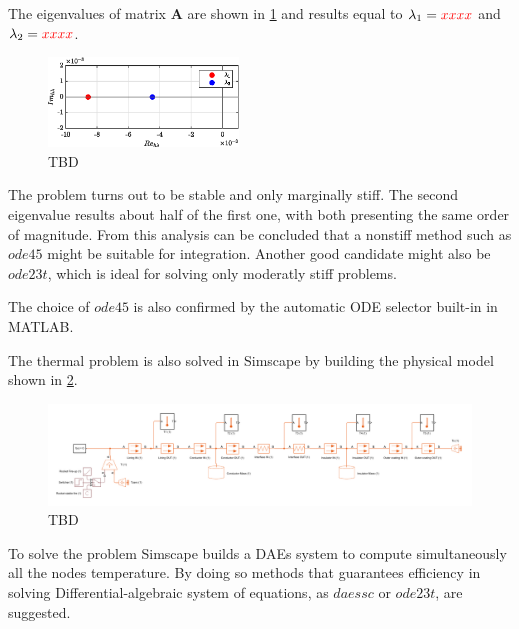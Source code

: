 \documentclass[11pt,a4paper,oneside]{article}
\renewcommand{\vec}[1]{\mathbf{#1}}
\newcommand{\tr}{\textcolor{red}}
\begin{document}
The eigenvalues of matrix $\vec{A}$ are shown in \cref{fig:ex1_eigenvalues} and results equal to $\lambda_1=\tr{xxxx}$ and $\lambda_2=\tr{xxxx}$.
\begin{figure}[htb]
    \centering
    \includegraphics[width=0.45\textwidth, keepaspectratio]{Figures/ex1_eigenvalues.eps}
    \caption[]{\label{fig:ex1_eigenvalues} TBD}
\end{figure}
\clearpage

The problem turns out to be stable and only marginally stiff.
The second eigenvalue results about half of the first one, with both presenting the same order of magnitude.
From this analysis can be concluded that a nonstiff method such as $ode45$ might be suitable for integration.
Another good candidate might also be $ode23t$, which is ideal for solving only moderatly stiff problems.

The choice of $ode45$ is also confirmed by the automatic ODE selector built-in in MATLAB.

The thermal problem is also solved in Simscape by building the physical model shown in \cref{fig:ex1_simscapeCase1}.
\begin{figure}[htb]
    \centering
    \includegraphics*[width=1\textwidth, keepaspectratio]{Figures/ex1_simscapeCase1.pdf}
    \caption[]{\label{fig:ex1_simscapeCase1} TBD}
\end{figure}

To solve the problem Simscape builds a DAEs system to compute simultaneously all the nodes temperature.
By doing so methods that guarantees efficiency in solving Differential-algebraic system of equations, as $daessc$ or $ode23t$, are suggested. 
\end{document}
